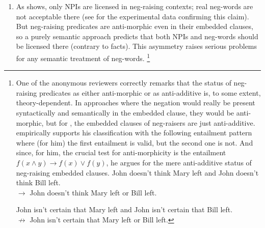 \documentclass[output=paper,colorlinks,citecolor=brown]{langscibook}
\begin{document}
\begin{enumerate}
\item
  As  shows, only NPIs are licensed in neg-raising contexts; real neg-words are not acceptable there (see \citealt{dovcekal2016experimentala} for the experimental data confirming this claim). But neg-raising predicates are anti-morphic even in their embedded clauses, so a purely semantic approach predicts that both NPIs and neg-words should be licensed there (contrary to facts). This asymmetry raises serious problems for any semantic treatment of neg-words.%
\footnote{One of the anonymous reviewers correctly remarks that the status of neg-raising predicates as either anti-morphic or as anti-additive is, to some extent, theory-dependent. In approaches where the negation would really be present syntactically and semantically in the embedded clause, they would be anti-morphic, but for \citet{gajewski_neg-raising_2005,gajewski_neg-raising_2007}, the embedded clauses of neg-raisers are just anti-additive. \citet[305]{gajewski_neg-raising_2007} empirically supports his classification with the following entailment pattern where (for him) the first entailment is valid, but the second one is not. And since, for him, the crucial test for anti-morphicity is the entailment $f(x \wedge y) \rightarrow f(x) \vee f(y)$, he argues for the mere anti-additive status of neg-raising embedded clauses. 
\ea John doesn’t think Mary left and John doesn’t think Bill left.\\$\rightarrow$
John doesn’t think Mary left or Bill left.
\z

\ea John isn’t certain that Mary left and John isn’t certain that Bill left.\\$\not\rightarrow$
John isn’t certain that Mary left or Bill left.
\z

}
\end{enumerate}
\end{document}
